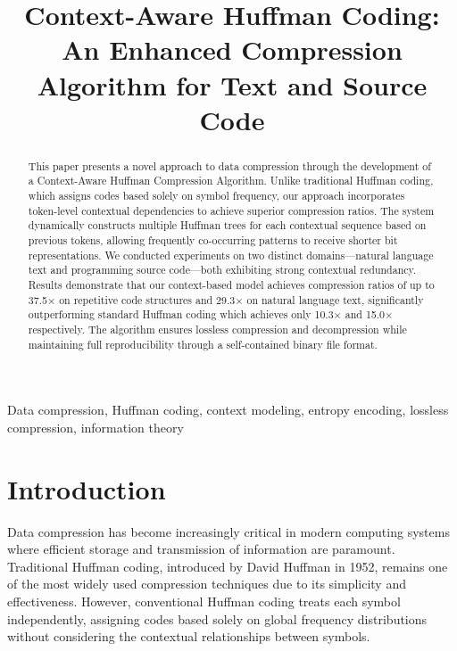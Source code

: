 \documentclass[conference]{IEEEtran}
\begin{document}
\title{Context-Aware Huffman Coding: An Enhanced Compression Algorithm for Text and Source Code}

\author{
}

\maketitle

\begin{abstract}
This paper presents a novel approach to data compression through the development of a Context-Aware Huffman Compression Algorithm. Unlike traditional Huffman coding, which assigns codes based solely on symbol frequency, our approach incorporates token-level contextual dependencies to achieve superior compression ratios. The system dynamically constructs multiple Huffman trees for each contextual sequence based on previous tokens, allowing frequently co-occurring patterns to receive shorter bit representations. We conducted experiments on two distinct domains—natural language text and programming source code—both exhibiting strong contextual redundancy. Results demonstrate that our context-based model achieves compression ratios of up to 37.5× on repetitive code structures and 29.3× on natural language text, significantly outperforming standard Huffman coding which achieves only 10.3× and 15.0× respectively. The algorithm ensures lossless compression and decompression while maintaining full reproducibility through a self-contained binary file format.
\end{abstract}

\begin{IEEEkeywords}
Data compression, Huffman coding, context modeling, entropy encoding, lossless compression, information theory
\end{IEEEkeywords}

\section{Introduction}
Data compression has become increasingly critical in modern computing systems where efficient storage and transmission of information are paramount. Traditional Huffman coding, introduced by David Huffman in 1952, remains one of the most widely used compression techniques due to its simplicity and effectiveness. However, conventional Huffman coding treats each symbol independently, assigning codes based solely on global frequency distributions without considering the contextual relationships between symbols.
\end{document}
